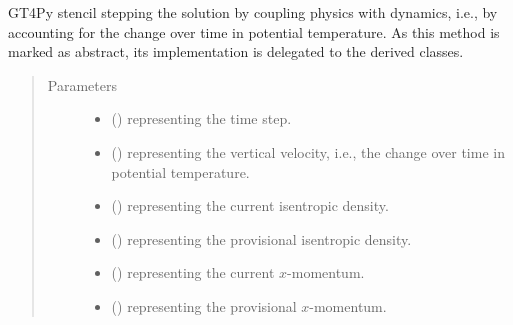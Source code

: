 \documentclass[letterpaper,10pt,english]{sphinxmanual}
\begin{document}
\begin{fulllineitems}
\begin{fulllineitems}
\label{\detokenize{api:dycore.prognostic_isentropic.PrognosticIsentropic._stencil_stepping_by_coupling_physics_with_dynamics_defs}}
GT4Py stencil stepping the solution by coupling physics with dynamics, i.e., by accounting for the
change over time in potential temperature.
As this method is marked as abstract, its implementation is delegated to the derived classes.
\begin{quote}\begin{description}
\item[{Parameters}] \leavevmode\begin{itemize}
\item {} 
 () \textendash{}  representing the time step.

\item {} 
 () \textendash{}  representing the vertical velocity, i.e., the change over time in potential temperature.

\item {} 
 () \textendash{}  representing the current isentropic density.

\item {} 
 () \textendash{}  representing the provisional isentropic density.

\item {} 
 () \textendash{}  representing the current \(x\)-momentum.

\item {} 
 () \textendash{}  representing the provisional \(x\)-momentum.


\end{itemize}
\end{description}
\end{quote}
\end{fulllineitems}
\end{fulllineitems}
\end{document}
